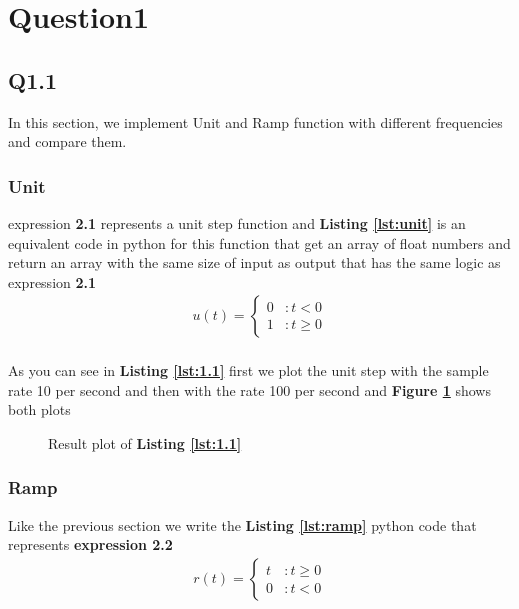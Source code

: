 \section{Question1}
\subsection{Q1.1}
In this section, we implement Unit and Ramp function
with different frequencies and compare them.
\subsubsection{Unit}
expression \textbf{2.1} represents a unit step function 
and \textbf{Listing \ref{lst:unit}} is an equivalent code in python 
for this function that get an array of float numbers 
and return an array with the same size of input as 
output that has the same logic as expression \textbf{2.1}
\begin{align}
    u(t) = \begin{cases}
     0 &: t<0\\
     1 &: t\geq 0\end{cases}
\end{align}

\vspace{2ex}
 \paragraph{} As you can see in \textbf{Listing \ref{lst:1.1}} first
 we plot the unit step with the sample rate 10 per second and then
 with the rate 100 per second and \textbf{Figure \ref{fig:2.1}}
 shows both plots
 \vspace{2ex}

 \begin{figure}[H]
    \resizebox{\textwidth}{!}{}
    \caption{Result plot of \textbf{Listing \ref{lst:1.1}}}
    \label{fig:2.1}
\end{figure}
 \subsubsection{Ramp}
  Like the previous section we write the \textbf{Listing \ref{lst:ramp}}  
  python code that represents \textbf{expression 2.2} 
  \begin{align}
    r(t) = \begin{cases}
     t &: t\geq 0\\
     0 &: t< 0\end{cases}
   \end{align}


